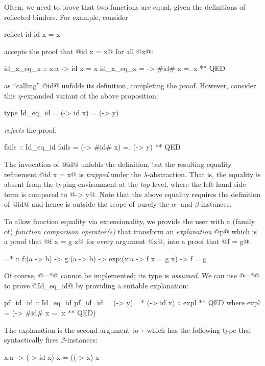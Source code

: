 Often, we need to prove that two
functions are equal, given the
definitions of reflected binders.
%
For example, consider
%
\begin{code}
 reflect id
 id x = x
\end{code}
%
\toolname accepts the proof that
@id x = x@ for all @x@:
%
\begin{code}
 id_x_eq_x :: x:a -> {id x = x}
 id_x_eq_x = \x -> #id# x =. x ** QED
\end{code}
%
as ``calling'' @id@ unfolds its definition,
completing the proof.
%
However, consider this $\eta$-expanded variant of
the above proposition:
%
\begin{code}
 type Id_eq_id = {(\x -> id x) = (\y -> y)}
\end{code}
%
\toolname \emph{rejects} the proof:
%
\begin{code}
 fails :: Id_eq_id
 fails =  (\x -> #id# x) =. (\y -> y) ** QED
\end{code}
%
The invocation of @id@ unfolds the
definition, but the resulting equality
refinement @{id x = x}@ is \emph{trapped}
under the $\lambda$-abstraction.
%
That is, the equality is absent from the
typing environment at the \emph{top} level,
where the left-hand side term is compared to @\y -> y@.
%
Note that the above equality requires
the definition of @id@ and hence is
outside the scope of purely the
$\alpha$- and $\beta$-instances.

\newcommand\eqfun{\ensuremath{\texttt{=}\forall}}

%
To allow function equality via
extensionality, we provide the
user with a (family of)
%
\emph{function comparison operator(s)}
that transform an \emph{explanation} @p@
which is a proof that @f x = g x@ for every
argument @x@, into a proof that @f = g@.
%
\begin{mcode}
  =* :: f:(a -> b) -> g:(a -> b)
     -> exp:(x:a -> {f x = g x})
     -> {f = g}
\end{mcode}
%
Of course, @=*@ cannot be implemented;
its type is \emph{assumed}. We can use
@=*@ to prove @Id_eq_id@ by providing
a suitable explanation:
%
\begin{mcode}
pf_id_id :: Id_eq_id
pf_id_id = (\y -> y) =* (\x -> id x) $\because$ expl ** QED
  where
    expl = (\x -> #id# x =. x ** QED)
\end{mcode}
%
%
The explanation is
the second argument to $\because$ which has
the following type that syntactically fires $\beta$-instances:
\begin{code}
  x:a -> {(\x -> id x) x = ((\x -> x) x}
\end{code}

